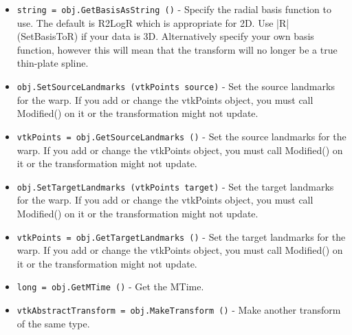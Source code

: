 \begin{itemize}
\item  \verb|string = obj.GetBasisAsString ()| -  Specify the radial basis function to use.  The default is
 R2LogR which is appropriate for 2D. Use |R| (SetBasisToR) 
 if your data is 3D. Alternatively specify your own basis function, 
 however this will mean that the transform will no longer be a true 
 thin-plate spline.

\item  \verb|obj.SetSourceLandmarks (vtkPoints source)| -  Set the source landmarks for the warp.  If you add or change the
 vtkPoints object, you must call Modified() on it or the transformation
 might not update.

\item  \verb|vtkPoints = obj.GetSourceLandmarks ()| -  Set the source landmarks for the warp.  If you add or change the
 vtkPoints object, you must call Modified() on it or the transformation
 might not update.

\item  \verb|obj.SetTargetLandmarks (vtkPoints target)| -  Set the target landmarks for the warp.  If you add or change the
 vtkPoints object, you must call Modified() on it or the transformation
 might not update.

\item  \verb|vtkPoints = obj.GetTargetLandmarks ()| -  Set the target landmarks for the warp.  If you add or change the
 vtkPoints object, you must call Modified() on it or the transformation
 might not update.

\item  \verb|long = obj.GetMTime ()| -  Get the MTime.

\item  \verb|vtkAbstractTransform = obj.MakeTransform ()| -  Make another transform of the same type.

\end{itemize}
